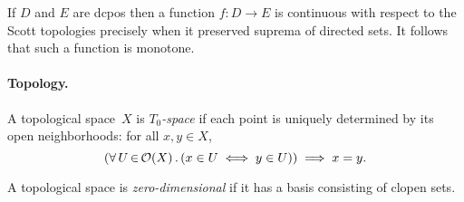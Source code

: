 If $D$ and $E$ are dcpos then a function $f : D \to E$ is continuous
with respect to the Scott topologies precisely when it preserved
suprema of directed sets. It follows that such a function is monotone.


\paragraph{Topology.}

A topological space~$X$ is \emph{$T_0$-space} if each point is
uniquely determined by its open neighborhoods: for all $x, y \in
X$,
%
\begin{equation*}
  (\forall\, U \,{\in}\, \mathcal{O}(X)\,.\left(x \in U \iff y \in U\right)) \implies x = y.
\end{equation*}

A topological space is \emph{zero-dimensional} if it has a basis
consisting of clopen sets.






